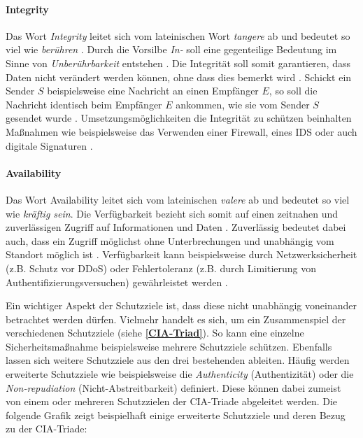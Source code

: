 \paragraph*{Integrity}  
Das Wort \textit{Integrity} leitet sich vom lateinischen Wort \textit{tangere} ab und bedeutet so viel wie \textit{berühren} \cite{pons}. Durch die Vorsilbe \textit{In-} soll eine gegenteilige Bedeutung  im Sinne von \textit{Unberührbarkeit} entstehen \cite{samonas2014cia}. 
Die Integrität soll somit garantieren, dass Daten nicht verändert werden können, ohne dass dies bemerkt wird \cite{agarwal2011security}. Schickt ein Sender $S$ beispielsweise eine Nachricht an einen Empfänger $E$, so soll die Nachricht identisch beim Empfänger $E$ ankommen, wie sie vom Sender $S$ gesendet wurde \cite{agarwal2011security}.
Umsetzungsmöglichkeiten die Integrität zu schützen beinhalten Maßnahmen wie beispielsweise das Verwenden einer Firewall, eines \ac{IDS} oder auch digitale Signaturen \cite{agarwal2011security}.

\paragraph*{Availability}
Das Wort Availability leitet sich vom lateinischen \textit{valere} ab und bedeutet so viel wie \textit{kräftig sein}. Die Verfügbarkeit bezieht sich somit auf einen zeitnahen und zuverlässigen Zugriff auf Informationen und Daten \cite{samonas2014cia}. Zuverlässig bedeutet dabei auch, dass ein Zugriff möglichst ohne Unterbrechungen und unabhängig vom Standort möglich ist \cite{agarwal2011security}.
Verfügbarkeit kann beispielsweise durch Netzwerksicherheit (z.B. Schutz vor \ac{DDoS}) oder Fehlertoleranz (z.B. durch Limitierung von Authentifizierungsversuchen) gewährleistet werden \cite{agarwal2011security}.

Ein wichtiger Aspekt der Schutzziele ist, dass diese nicht unabhängig voneinander betrachtet werden dürfen. Vielmehr handelt es sich, um ein Zusammenspiel der verschiedenen Schutzziele (siehe \textbf{\ref{CIA-Triad}}). So kann eine einzelne Sicherheitsmaßnahme beispielsweise mehrere Schutzziele schützen. Ebenfalls lassen sich weitere Schutzziele aus den drei bestehenden ableiten. Häufig werden erweiterte Schutzziele wie beispielsweise die \textit{Authenticity} (Authentizität) oder die \textit{Non-repudiation} (Nicht-Abstreitbarkeit) \cite{samonas2014cia} definiert. Diese können dabei zumeist von einem oder mehreren Schutzzielen der CIA-Triade abgeleitet werden. Die folgende Grafik zeigt beispielhaft einige erweiterte Schutzziele und deren Bezug zu der CIA-Triade:

